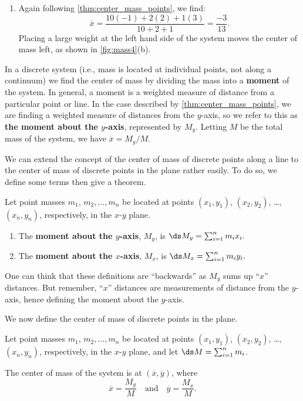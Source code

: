 \begin{example}
\begin{enumerate}
	\item	Again following \autoref{thm:center_mass_points}, we find:
	\[\overline{x} = \frac{10(-1)+2(2)+1(3)}{10+2+1} = \frac{-3}{13}%
	.\]
	Placing a large weight at the left hand side of the system moves the center of mass left, as shown in \autoref{fig:mass4}(b).
\end{enumerate}
\end{example}

In a discrete system (i.e., mass is located at individual points, not along a continuum) we find the center of mass by dividing the mass into a \textbf{moment} of the system. In general, a moment is a weighted measure of distance from a particular point or line. In the case described by \autoref{thm:center_mass_points}, we are finding a weighted measure of distances from the $y$-axis, so we refer to this as \textbf{the moment about the $y$-axis}, represented by $M_y$.  Letting $M$ be the total mass of the system, we have  $\overline{x} = M_y/M$. 

We can extend the concept of the center of mass of discrete points along a line to the center of mass of discrete points in the plane rather easily. To do so, we define some terms then give a theorem.

\begin{definition}\label{def:moment}%
Let point masses $m_1$, $m_2,\dots,m_n$ be located at points $(x_1,y_1)$, $(x_2,y_2)$, \dots, $(x_n,y_n)$, respectively, in the $x$-$y$ plane. 
\begin{enumerate}
	\item The \textbf{moment about the $y$-axis}, $M_y$, is 
	$\ds M_y = \sum_{i=1}^n m_ix_i.$
	\item The \textbf{moment about the $x$-axis}, $M_x$, is 
	$\ds M_x = \sum_{i=1}^n m_iy_i.$
	\end{enumerate}
\end{definition}

One can think that these definitions are ``backwards'' as $M_y$ sums up ``$x$'' distances. But remember, ``$x$'' distances are measurements of distance from the $y$-axis, hence defining the moment about the $y$-axis.

We now define the center of mass of discrete points in the plane.

\begin{theorem}\label{thm:center_mass_points_plane}%
Let point masses $m_1$, $m_2,\dots,m_n$ be located at points $(x_1,y_1)$, $(x_2,y_2)$, \dots, $(x_n,y_n)$, respectively, in the $x$-$y$ plane, and let $\ds M = \sum_{i=1}^n m_i$.  

The center of mass of the system is at $(\overline{x},\overline{y})$, where 
\[\overline{x}= \frac{M_y}{M}\quad \text{and}\quad \overline{y} = \frac{M_x}{M}.\]
\end{theorem}

